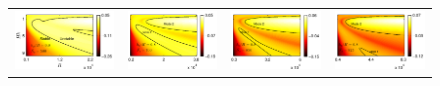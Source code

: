 \documentclass[aps,prl,twocolumn,showpacs,superscriptaddress,groupedaddress,10pt]{revtex4-1}  %
\begin{document}
\begin{figure}



\begin{tabular}{cccc}
{\includegraphics[scale = 0.72]{Set4_dens28_imgsc}} &
{\includegraphics[scale = 0.72]{Set4_dens30_imgsc}} &
{\includegraphics[scale = 0.72]{Set4_dens32_imgsc}} &
{\includegraphics[scale = 0.72]{Set4_dens34_imgsc}} \\

\end{tabular}
\end{figure}
\end{document}
